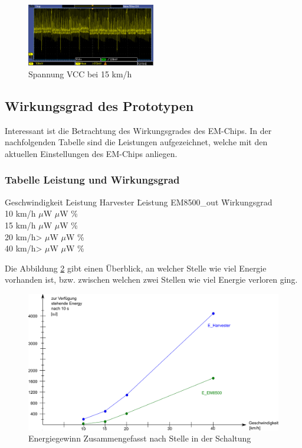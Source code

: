 \begin{figure}[ht]
    \includegraphics[width=0.5\textwidth]{4Resultate/imag/SpannungVCC.png} 
    \caption{Spannung VCC bei 15 km/h}
    \label{resutat_emchip_spannung}
\end{figure}


\subsection{Wirkungsgrad des Prototypen}

Interessant ist die Betrachtung des Wirkungsgrades des EM-Chips. In der nachfolgenden Tabelle sind die Leistungen aufgezeichnet, welche mit den aktuellen Einstellungen des EM-Chips anliegen.

\subsubsection*{Tabelle Leistung und Wirkungsgrad }
\begin{tabbing}
    Geschwindigkeit \quad\= Leistung Harvester \quad\= Leistung EM8500\_out \quad\= Wirkungsgrad\\[0.8ex]
    10 km/h    $\mu$W    $\mu$W \thinspace\%  \\
    15 km/h    $\mu$W   $\mu$W \thinspace\%  \\
    20 km/h>  $\mu$W   $\mu$W \thinspace\%  \\
    40 km/h>  $\mu$W  $\mu$W \thinspace\%  \\
\end{tabbing}   

Die Abbildung \ref{zsmEnergyGewinn} gibt einen Überblick, an welcher Stelle wie viel Energie vorhanden ist, bzw. zwischen welchen zwei Stellen wie viel Energie verloren ging.

\begin{figure}[ht]
    \includegraphics[width=1\textwidth]{4Resultate/imag/EnergyGewinnNachStelle.png} 
    \caption{Energiegewinn Zusammengefasst nach Stelle in der Schaltung}
    \label{zsmEnergyGewinn}
\end{figure}

